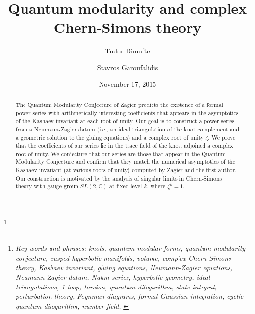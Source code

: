 \documentclass[12pt]{amsart}
\theoremstyle{definition}
\newcommand{\C}{\mathbb{C}}
\begin{document}

\title[Quantum modularity and complex Chern-Simons theory]{
Quantum modularity and complex Chern-Simons theory}
\author{Tudor Dimofte}
\address{Perimeter Institute for Theoretical Physics, 31 Caroline St N, Waterloo, ON N2J 2Y5, Canada; and \newline\indent
         School of Natural Sciences, Institute for Advanced Study, Princeton, NJ 08540, USA; \newline
         \indent on leave from Dept. of Mathematics, University of California, Davis, CA 95616, USA
        }
\author{Stavros Garoufalidis}
\address{School of Mathematics \\
         Georgia Institute of Technology \\
         Atlanta, GA 30332-0160, USA \newline
         {\tt \url{http://www.math.gatech.edu/~stavros }}}
\thanks{%
{\em Key words and phrases: knots, quantum modular forms, quantum modularity
conjecture, cusped hyperbolic manifolds, volume, complex Chern-Simons theory, 
Kashaev invariant, gluing equations, Neumann-Zagier equations, Neumann-Zagier 
datum, Nahm series, hyperbolic geometry, ideal triangulations, 1-loop, 
torsion, quantum dilogarithm, state-integral, perturbation theory, 
Feynman diagrams, formal Gaussian integration, cyclic quantum dilogarithm,
number field.
}
}

\date{November 17, 2015}%


\begin{abstract}
The Quantum Modularity Conjecture of Zagier predicts the existence of a formal
power series with arithmetically interesting coefficients that appears in
the asymptotics of the Kashaev invariant at each root of unity. 
Our goal is to construct a power series from a Neumann-Zagier datum
(i.e.,  an ideal triangulation of the knot complement and a geometric 
solution to the gluing equations) and a complex root of unity $\zeta$.
We prove that the coefficients of our series lie in the trace field
of the knot, adjoined a complex root of unity.
We conjecture that our series are those that appear in the 
Quantum Modularity Conjecture and confirm that they match the numerical
asymptotics of the Kashaev invariant (at various roots of unity)
computed by Zagier and the first author. Our construction is motivated 
by the analysis of singular limits in Chern-Simons theory 
with gauge group $SL(2,\C)$ at fixed level $k$, where $\zeta^k=1$.
\end{abstract}
\end{document}
